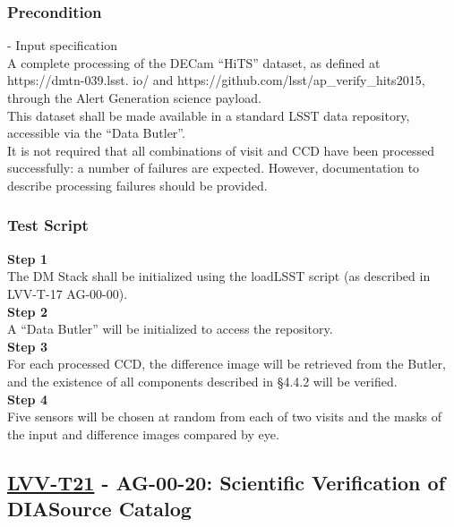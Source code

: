 \subsubsection{Precondition}\label{precondition-3}

- Input specification\\[2\baselineskip]A complete processing of the
DECam ``HiTS'' dataset, as defined at https://dmtn-039.lsst. io/ and
https://github.com/lsst/ap\_verify\_hits2015, through the Alert
Generation science payload.\\
This dataset shall be made available in a standard LSST data repository,
accessible via the ``Data Butler''.\\
It is not required that all combinations of visit and CCD have been
processed successfully: a number of failures are expected. However,
documentation to describe processing failures should be provided.

\subsubsection{Test Script}\label{test-script-3}

\textbf{Step 1}\\
The DM Stack shall be initialized using the loadLSST script (as
described in LVV-T-17 AG-00-00).\\[2\baselineskip]\textbf{Step 2}\\
A ``Data Butler'' will be initialized to access the
repository.\\[2\baselineskip]\textbf{Step 3}\\
For each processed CCD, the difference image will be retrieved from the
Butler, and the existence of all components described in §4.4.2 will be
verified.\\[2\baselineskip]\textbf{Step 4}\\
Five sensors will be chosen at random from each of two visits and the
masks of the input and difference images compared by
eye.\\[2\baselineskip]

\hypertarget{lvv-t21---ag-00-20-scientific-verification-of-diasource-catalog}{\subsection{\texorpdfstring{\href{https://jira.lsstcorp.org/secure/Tests.jspa\#/testCase/LVV-T21}{LVV-T21}
- AG-00-20: Scientific Verification of DIASource
Catalog}{LVV-T21 - AG-00-20: Scientific Verification of DIASource Catalog}}\label{lvv-t21---ag-00-20-scientific-verification-of-diasource-catalog}}

